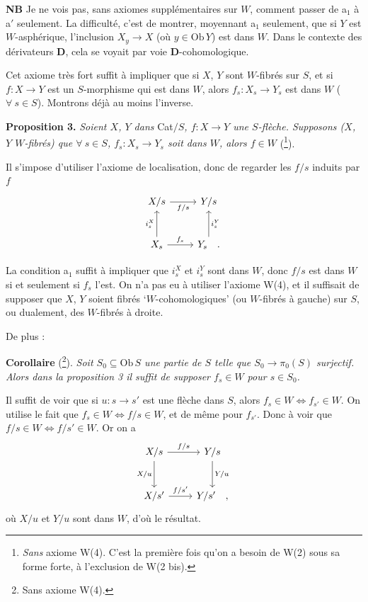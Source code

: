 \documentclass[11pt]{article}
\newcommand{\printedpage}[1]{\marginpar{\footnotesize p.~#1}}
\newcommand{\msp}[1]{\marginpar{\footnotesize [#1]}}
\begin{document}
\textbf{NB} Je ne vois pas, sans axiomes supplémentaires sur $W$, comment passer de a$_1$ à a$'$ seulement. La difficulté, c'est de montrer, moyennant a$_1$ seulement, que si $Y$ est $W$-asphérique, l'inclusion $X_y \longrightarrow X$ (où $y \in \mathrm{Ob}\,Y$) est dans $W$. Dans le contexte des dérivateurs \textbf{D}, cela se voyait par voie \textbf{D}-cohomologique.

Cet axiome très fort suffit à impliquer que si $X$, $Y$ sont $W$-fibrés sur $S$, et si $f : X \longrightarrow Y$ est un $S$-morphisme qui est dans $W$, alors $f_s : X_s \longrightarrow Y_s$ est dans $W$ ($\forall\ s \in S$). Montrons déjà au moins l'inverse.

\msp{page 6}

\textbf{Proposition 3.} \textit{Soient $X$, $Y$ dans} Cat$/S$\textit{, $f : X \longrightarrow Y$ une $S$-flèche. Supposons ($X$, $Y$ $W$-fibrés) que $\forall\ s \in S$, $f_s : X_s \longrightarrow Y_s$ soit dans $W$, alors $f \in W$} (\footnote[8]{\textit{Sans} axiome W(4). C'est la première fois qu'on a besoin de W(2) sous sa forme forte, à l'exclusion de W(2 bis).}).

Il s'impose d'utiliser l'axiome de localisation, donc de regarder les $f/s$ induits par $f$
\printedpage{6}
\[
\begin{tikzcd}[row sep=large]
X/s \arrow[r, "f/s"'] & Y/s \\
X_s \arrow[u, "i_s^X"] \arrow[r, "f_s"] & Y_s \arrow[u, "i_s^Y"'] \quad .
\end{tikzcd}
\]

La condition a$_1$ suffit à impliquer que $i_s^X$ et $i_s^Y$ sont dans $W$, donc $f/s$ est dans $W$ si et seulement si $f_s$ l'est. On n'a pas eu à utiliser l'axiome W(4), et il suffisait de supposer que $X$, $Y$ soient fibrés ‘$W$-cohomologiques’ (ou $W$-fibrés à gauche) sur $S$, ou dualement, des $W$-fibrés à droite.

De plus :

\textbf{Corollaire} (\footnote[9]{Sans axiome W(4).}). \textit{Soit $S_0 \subseteq \mathrm{Ob}\,S$ une partie de $S$ telle que $S_0 \longrightarrow \pi_0(S)$ surjectif. Alors dans la proposition 3 il suffit de supposer $f_s \in W$ pour $s \in S_0$.}

Il suffit de voir que si $u : s \longrightarrow s'$ est une flèche dans $S$, alors $f_s \in W \iff f_{s'} \in W$. On utilise le fait que $f_s \in W \iff f/s \in W$, et de même pour $f_{s'}$. Donc à voir que $f/s \in W \iff f/s' \in W$. Or on a
\[
\begin{tikzcd}[row sep=large]
X/s \arrow[r, "f/s"] \arrow[d, "X/u"'] & Y/s \arrow[d, "Y/u"] \\
X/s' \arrow[r, "f/s'"] & Y/s' \quad ,
\end{tikzcd}
\]
où $X/u$ et $Y/u$ sont dans $W$, d'où le résultat.
\end{document}
